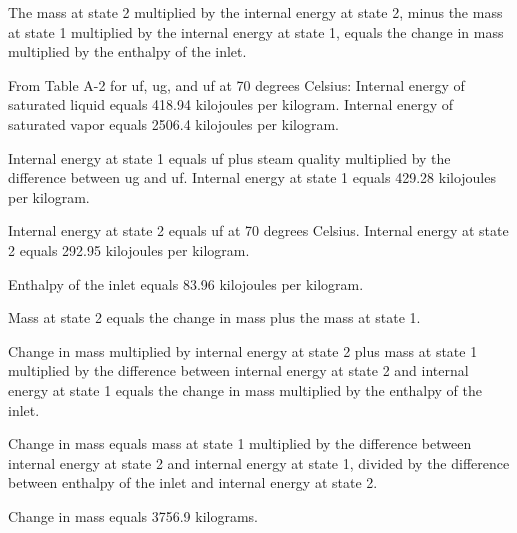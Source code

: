The mass at state 2 multiplied by the internal energy at state 2, minus the mass at state 1 multiplied by the internal energy at state 1, equals the change in mass multiplied by the enthalpy of the inlet.  

From Table A-2 for uf, ug, and uf at 70 degrees Celsius:  
Internal energy of saturated liquid equals 418.94 kilojoules per kilogram.  
Internal energy of saturated vapor equals 2506.4 kilojoules per kilogram.  

Internal energy at state 1 equals uf plus steam quality multiplied by the difference between ug and uf.  
Internal energy at state 1 equals 429.28 kilojoules per kilogram.  

Internal energy at state 2 equals uf at 70 degrees Celsius.  
Internal energy at state 2 equals 292.95 kilojoules per kilogram.  

Enthalpy of the inlet equals 83.96 kilojoules per kilogram.  

Mass at state 2 equals the change in mass plus the mass at state 1.  

Change in mass multiplied by internal energy at state 2 plus mass at state 1 multiplied by the difference between internal energy at state 2 and internal energy at state 1 equals the change in mass multiplied by the enthalpy of the inlet.  

Change in mass equals mass at state 1 multiplied by the difference between internal energy at state 2 and internal energy at state 1, divided by the difference between enthalpy of the inlet and internal energy at state 2.  

Change in mass equals 3756.9 kilograms.